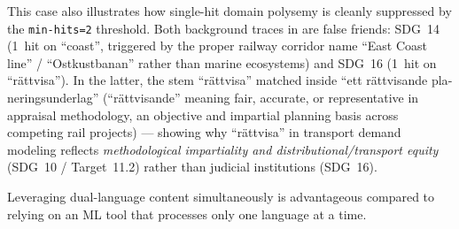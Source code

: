 \begin{casestudySection}
This case also illustrates how single-hit domain polysemy is cleanly suppressed by the \texttt{min-hits=2} threshold. Both background traces in  are false friends: \gls{SDG}~14 (\num{1}~hit on \enquote{coast}, triggered by the proper railway corridor name \enquote{East Coast line} / \enquote{\foreignlanguage{swedish}{Ostkustbanan}} rather than marine ecosystems) and \gls{SDG}~16 (\num{1}~hit on \enquote{\foreignlanguage{swedish}{rättvisa}}). In the latter, the stem \enquote{\foreignlanguage{swedish}{rättvisa}} matched inside \enquote{\foreignlanguage{swedish}{ett rättvisande planeringsunderlag}} (\enquote{\foreignlanguage{swedish}{rättvisande}} meaning fair, accurate, or representative in appraisal methodology, \ie an objective and impartial planning basis across competing rail projects) --- showing why \enquote{\foreignlanguage{swedish}{rättvisa}} in transport demand modeling reflects \textit{methodological impartiality and distributional/transport equity} (\gls{SDG}~10 / Target~11.2) rather than judicial institutions (\gls{SDG}~16).
\end{casestudySection}

\begin{takeaway}
Leveraging dual-language content simultaneously is advantageous compared to relying on an \gls{ML} tool that processes only one language at a time.
\end{takeaway}

